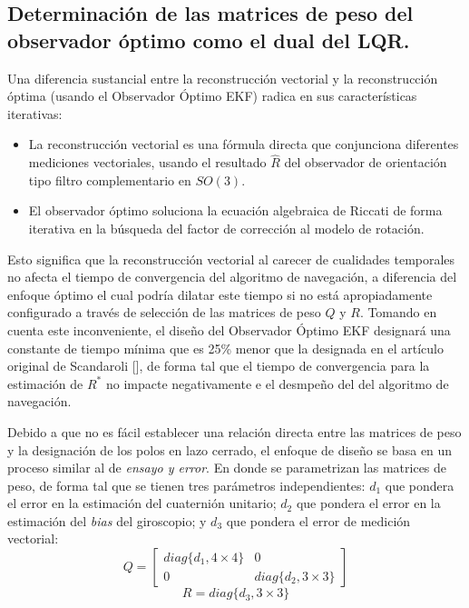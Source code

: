 \documentclass[10pt]{report}
\numberwithin{equation}{chapter}
\numberwithin{algorithm}{chapter}
\newcommand{\bcite}[1]{[\cite{#1}]}
\begin{document}
\subsection{Determinación de las matrices de peso del observador óptimo como el dual del LQR.}
Una diferencia sustancial entre la reconstrucción vectorial y la reconstrucción óptima (usando el Observador Óptimo EKF) radica en sus características iterativas:
\begin{itemize}
\item La reconstrucción vectorial es una fórmula directa que conjunciona diferentes mediciones vectoriales, usando el resultado $\hat{R}$ del observador de orientación tipo filtro complementario en $SO(3)$.
\item El observador óptimo soluciona la ecuación algebraica de Riccati de forma iterativa en la búsqueda del factor de corrección al modelo de rotación.
\end{itemize}
Esto significa que la reconstrucción vectorial al carecer de cualidades temporales no afecta el tiempo de convergencia del algoritmo de navegación, a diferencia del enfoque óptimo el cual podría dilatar este tiempo si no está apropiadamente configurado a través de selección de las matrices de peso $Q$ y $R$. Tomando en cuenta este inconveniente, el diseño del Observador Óptimo EKF designará una constante de tiempo mínima que es 25\% menor que la designada en el artículo original de Scandaroli \bcite{Scandaro2011}, de forma tal que el tiempo de convergencia para la estimación de $R^*$ no impacte negativamente e el desmpeño del del algoritmo de navegación.\par
Debido a que no es fácil establecer una relación directa entre las matrices de peso y la designación de los polos en lazo cerrado, el enfoque de diseño se basa en un proceso similar al de \emph{ensayo y error}. En donde se parametrizan las matrices de peso, de forma tal que se tienen tres parámetros independientes: $d_1$ que pondera el error en la estimación del cuaternión unitario; $d_2$ que pondera el error en la estimación del \emph{bias} del giroscopio; y $d_3$ que pondera el error de medición vectorial:
\begin{equation}
Q=\begin{bmatrix}
diag\{d_1,4\times4\}&0\\
0&diag\{d_2,3\times3\}
\end{bmatrix}
\end{equation}
\begin{equation}
R=diag\{d_3,3\times3\}
\end{equation}
\end{document}
